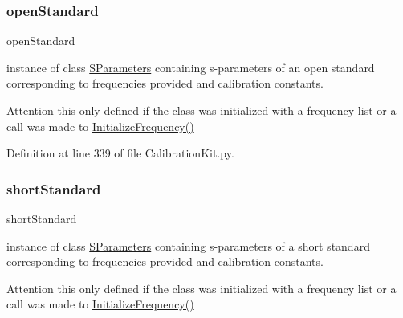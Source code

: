\subsubsection{\texorpdfstring{open\+Standard}{openStandard}}
{\footnotesize\ttfamily open\+Standard}



instance of class \hyperlink{namespaceSignalIntegrity_1_1SParameters}{S\+Parameters} containing s-\/parameters of an open standard corresponding to frequencies provided and calibration constants. 

\begin{DoxyAttention}{Attention}
this only defined if the class was initialized with a frequency list or a call was made to \hyperlink{classSignalIntegrity_1_1Measurement_1_1CalKit_1_1CalibrationKit_1_1CalibrationKit_a068ffbf43377a9e28cccb8b6013772ea}{Initialize\+Frequency()} 
\end{DoxyAttention}


Definition at line 339 of file Calibration\+Kit.\+py.

\mbox{\label{classSignalIntegrity_1_1Measurement_1_1CalKit_1_1CalibrationKit_1_1CalibrationKit_a094c01f8f3b9b22b8759481b3d5bdb85}} 
\subsubsection{\texorpdfstring{short\+Standard}{shortStandard}}
{\footnotesize\ttfamily short\+Standard}



instance of class \hyperlink{namespaceSignalIntegrity_1_1SParameters}{S\+Parameters} containing s-\/parameters of a short standard corresponding to frequencies provided and calibration constants. 

\begin{DoxyAttention}{Attention}
this only defined if the class was initialized with a frequency list or a call was made to \hyperlink{classSignalIntegrity_1_1Measurement_1_1CalKit_1_1CalibrationKit_1_1CalibrationKit_a068ffbf43377a9e28cccb8b6013772ea}{Initialize\+Frequency()} 
\end{DoxyAttention}


